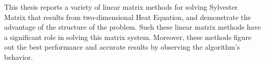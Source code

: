 This thesis reports a variety of linear matrix methods for solving Sylvester Matrix that results from two-dimensional Heat Equation, and demonstrate the advantage of the structure of the problem. Such these linear matrix methods have a significant role in solving this matrix system. Moreover, these methods figure out the best performance and accurate results by observing the algorithm’s behavior.
